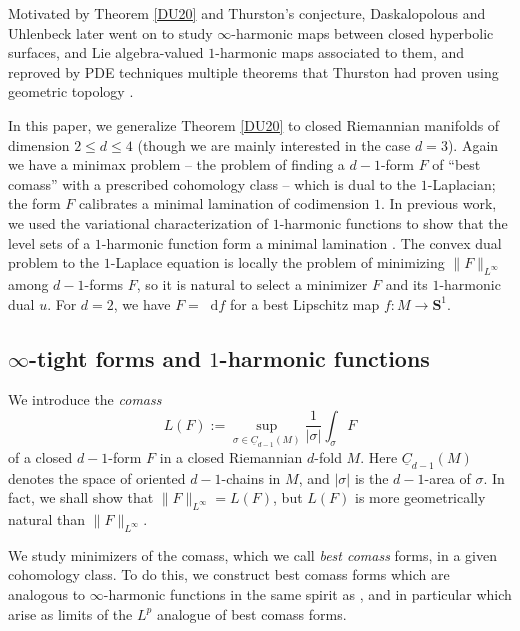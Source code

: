 \documentclass[reqno,11pt]{amsart}
\newcommand{\Sph}{\mathbf S}
\newcommand*\dif{\mathop{}\!\mathrm{d}}
\newcommand{\Chain}{\underline C}
\newcommand{\dfn}[1]{\emph{#1}\index{#1}}
\theoremstyle{definition}
\numberwithin{equation}{section}
\begin{document}
Motivated by Theorem \ref{DU20} and Thurston's conjecture, Daskalopolous and Uhlenbeck later went on to study $\infty$-harmonic maps between closed hyperbolic surfaces, and Lie algebra-valued $1$-harmonic maps associated to them, and reproved by PDE techniques multiple theorems that Thurston had proven using geometric topology \cite{daskalopoulos2022,daskalopoulos2023}.

In this paper, we generalize Theorem \ref{DU20} to closed Riemannian manifolds of dimension $2 \leq d \leq 4$ (though we are mainly interested in the case $d = 3$).
Again we have a minimax problem -- the problem of finding a $d-1$-form $F$ of ``best comass'' with a prescribed cohomology class -- which is dual to the $1$-Laplacian; the form $F$ calibrates a minimal lamination of codimension $1$.
In previous work, we used the variational characterization of $1$-harmonic functions to show that the level sets of a $1$-harmonic function form a minimal lamination \cite[Theorem C]{BackusCML}.
The convex dual problem to the $1$-Laplace equation is locally the problem of minimizing $\|F\|_{L^\infty}$ among $d-1$-forms $F$, so it is natural to select a minimizer $F$ and its $1$-harmonic dual $u$.
For $d = 2$, we have $F = \dif f$ for a best Lipschitz map $f: M \to \Sph^1$.


\subsection{\texorpdfstring{$\infty$-tight forms and $1$-harmonic functions}{Infinity-tight forms and one-harmonic functions}}
We introduce the \dfn{comass}
\begin{equation}\label{comass}
L(F) := \sup_{\sigma \in \Chain_{d - 1}(M)} \frac{1}{|\sigma|} \int_\sigma F
\end{equation}
of a closed $d-1$-form $F$ in a closed Riemannian $d$-fold $M$.
Here $\Chain_{d - 1}(M)$ denotes the space of oriented $d - 1$-chains in $M$, and $|\sigma|$ is the $d-1$-area of $\sigma$.
In fact, we shall show that $\|F\|_{L^\infty} = L(F)$, but $L(F)$ is more geometrically natural than $\|F\|_{L^\infty}$.

We study minimizers of the comass, which we call \dfn{best comass} forms, in a given cohomology class.
To do this, we construct best comass forms which are analogous to $\infty$-harmonic functions in the same spirit as \cite{daskalopoulos2020transverse,daskalopoulos2022}, and in particular which arise as limits of the $L^p$ analogue of best comass forms.
\end{document}
